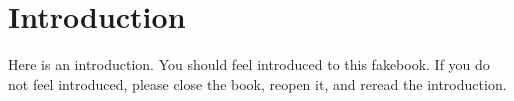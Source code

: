 \documentclass{book}
\begin{document}
\frontmatter

\chapter*{Introduction}
Here is an introduction. You should feel introduced to this fakebook. If you do not feel introduced, please close the book, reopen it, and reread the introduction.
\end{document}
